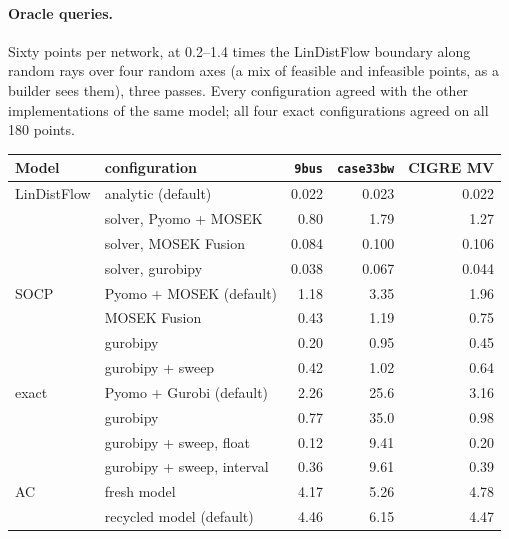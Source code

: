 \documentclass[11pt,a4paper]{report}
\newcommand{\code}[1]{\texttt{\small #1}}
\begin{document}
\paragraph{Oracle queries.} Sixty points per network, at 0.2--1.4 times the
LinDistFlow boundary along random rays over four random axes (a mix of feasible
and infeasible points, as a builder sees them), three passes. Every
configuration agreed with the other implementations of the same model; all four
exact configurations agreed on all 180 points.

\begin{center}\footnotesize
\begin{tabular}{@{}llrrr@{}}
\toprule
Model & configuration & \code{9bus} & \code{case33bw} & CIGRE MV \\
\midrule
LinDistFlow & analytic (default)          & 0.022 & 0.023 & 0.022 \\
            & solver, Pyomo + MOSEK       & 0.80  & 1.79  & 1.27  \\
            & solver, MOSEK Fusion        & 0.084 & 0.100 & 0.106 \\
            & solver, gurobipy            & 0.038 & 0.067 & 0.044 \\
\addlinespace
SOCP        & Pyomo + MOSEK (default)     & 1.18  & 3.35  & 1.96  \\
            & MOSEK Fusion                & 0.43  & 1.19  & 0.75  \\
            & gurobipy                    & 0.20  & 0.95  & 0.45  \\
            & gurobipy + sweep            & 0.42  & 1.02  & 0.64  \\
\addlinespace
exact       & Pyomo + Gurobi (default)    & 2.26  & 25.6  & 3.16  \\
            & gurobipy                    & 0.77  & 35.0  & 0.98  \\
            & gurobipy + sweep, float     & 0.12  & 9.41  & 0.20  \\
            & gurobipy + sweep, interval  & 0.36  & 9.61  & 0.39  \\
\addlinespace
AC          & fresh model                 & 4.17  & 5.26  & 4.78  \\
            & recycled model (default)    & 4.46  & 6.15  & 4.47  \\
\bottomrule
\end{tabular}
\end{center}
\end{document}
